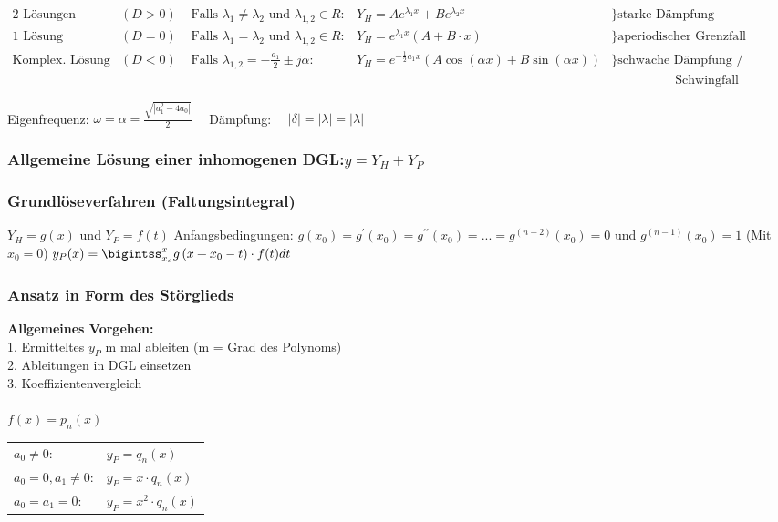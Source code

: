 $\begin{array}{lllll}
{\text{2 Lösungen}} & {(D>0)} & {\text { Falls } \lambda_{1} \neq \lambda_{2} \text { und } \lambda_{1,2} \in R :} & {Y_{H}=A e^{\lambda_{1} x}+B e^{\lambda_{2} x}} & { \} \text{starke Dämpfung}}\\
{\text{1 Lösung}} & {(D=0)} & {\text { Falls } \lambda_{1}=\lambda_{2} \text { und } \lambda_{1,2} \in R :} & {Y_{H}=e^{\lambda_{1} x}(A+B \cdot x)} & { \} \text{aperiodischer Grenzfall}}\\
{\text{Komplex. Lösung}} & {(D<0)} & {\text { Falls } \lambda_{1,2}=-\frac{a_{1}}{2} \pm j \alpha :} & {Y_{H}=e^{-\frac{1}{2} a_{1} x}(A \cos (\alpha x)+B \sin (\alpha x))} & { \} \text{schwache Dämpfung / }}\\ &&&& \quad \quad \quad \quad \quad \text{Schwingfall}
\end{array}$

Eigenfrequenz: $\omega=\alpha=\frac{\sqrt{\left|a_{1}^{2}-4 a_{0}\right|}}{2} \quad$ Dämpfung: $\quad|\delta|=|\lambda|=|\lambda|$

\subsubsection{Allgemeine Lösung einer inhomogenen DGL:\quad $y=Y_H + Y_P$\\}

\subsubsection{Grundlöseverfahren (Faltungsintegral)} \label{grundloeseverfahren}
$Y_H = g(x)$ und $Y_P = f(t)$\newline \newline
Anfangsbedingungen: $g\left(x_0\right) = g^{\prime}\left(x_0\right) = g^{\prime\prime}\left(x_0\right) = ... = g^{\left(n-2\right)}\left(x_0\right) = 0$
und $ g^{\left(n-1\right)}\left(x_0\right) = 1$ (Mit $ x_0 = 0 $)
\newline
\newline
$y_{P}(x)=\bigintss_{x_{o}}^{x} g\left(x+x_{0}-t\right) \cdot f(t) d t$

\subsubsection{Ansatz in Form des Störglieds}
\textbf{Allgemeines Vorgehen:}\\
1. Ermitteltes $y_P$ m mal ableiten (m = Grad des Polynoms) \\
2. Ableitungen in DGL einsetzen \\
3. Koeffizientenvergleich \\ \\
\underline{$f(x)=p_n(x)$}\\
\begin{tabular}{p{8cm}p{4cm}}
$a_0\neq 0$:          & $y_P = q_n(x)$\\
$a_0 = 0 , a_1\neq 0$:& $y_P=x\cdot q_n(x)$\\
$a_0=a_1=0$:          & $y_P=x^2\cdot q_n(x)$\\
\end{tabular}

